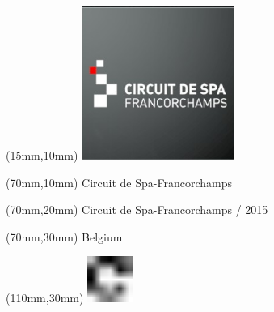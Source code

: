 \null\newpage
\begin{textblock*}{50mm}(15mm,10mm)%
\includegraphics[width=50mm]{LG/2015-05-20_00079.png}
\end{textblock*}
\begin{textblock*}{130mm}(70mm,10mm)%
{\fontsize{20}{20}\selectfont Circuit de Spa-Francorchamps}\\
\end{textblock*}
\begin{textblock*}{120mm}(70mm,20mm)%
{\fontsize{16}{16}\selectfont Circuit de Spa-Francorchamps / 2015}\\
\end{textblock*}
\begin{textblock*}{120mm}(70mm,30mm)%
{\fontsize{12}{12}\selectfont Belgium}
\end{textblock*}
\begin{textblock*}{30mm}(110mm,30mm)%
\centering
\includegraphics[height=15mm]{icons/fa-rotate-right.pdf}
\end{textblock*}
